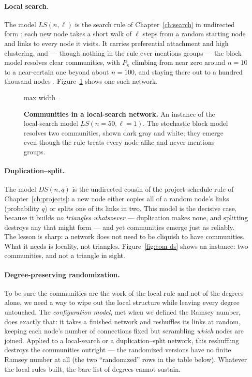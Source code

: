 \paragraph{Local search.} The model $LS(n,\ell)$ is the search rule of
Chapter~\ref{ch:search} in undirected form \citep{vazquez2001}: each new node
takes a short walk of $\ell$ steps from a random starting node and links to every
node it visits. It carries preferential attachment and high clustering, and ---
though nothing in the rule ever mentions groups --- the block model resolves clear
communities, with $P_\kappa$ climbing from near zero around $n=10$ to a
near-certain one beyond about $n=100$, and staying there out to a hundred thousand
nodes \citep{vazquezcommunities2025}. Figure~\ref{fig:com-ls} shows one such network.

\begin{figure}[t]
\centering
\begin{adjustbox}{max width=\linewidth}\end{adjustbox}
\caption{\textbf{Communities in a local-search network.} An instance of the
local-search model $LS(n{=}50,\ell{=}1)$. The stochastic block model
resolves two communities, shown dark gray and white; they emerge even though the
rule treats every node alike and never mentions groups.}
\label{fig:com-ls}
\end{figure}

\paragraph{Duplication--split.} The model $DS(n,q)$ is the undirected
cousin of the project-schedule rule of Chapter~\ref{ch:projects}: a new node
either copies all of a random node's links (probability $q$) or splits one of its
links in two. This model is the decisive case, because it builds \emph{no
triangles whatsoever} --- duplication makes none, and splitting destroys any that
might form --- and yet communities emerge just as reliably. The lesson is sharp: a
network does not need to be cliquish to have communities. What it needs is
locality, not triangles. Figure~\ref{fig:com-ds} shows an instance: two
communities, and not a triangle in sight.

\paragraph{Degree-preserving randomization.} To be sure the communities are the
work of the local rule and not of the degrees alone, we need a way to wipe out the
local structure while leaving every degree untouched. The \emph{configuration
model}, met when we defined the Ramsey number, does exactly that: it takes a
finished network and reshuffles its links at random, keeping each node's number of
connections fixed but scrambling \emph{which} nodes are joined. Applied to a
local-search or a duplication--split network, this reshuffling destroys the
communities outright --- the randomized versions have no finite Ramsey number at
all (the two ``randomized'' rows in the table below). Whatever the local rules
built, the bare list of degrees cannot sustain.

